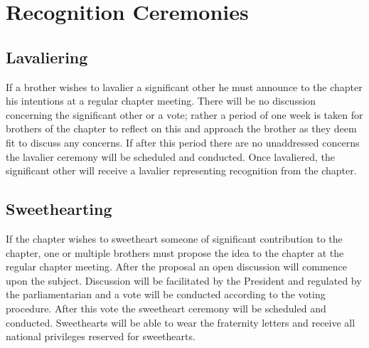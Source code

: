 \chapter{Recognition Ceremonies}
\label{cha:recognition-ceremonies}

\section{Lavaliering}

If a brother wishes to lavalier a significant other he must announce to the
chapter his intentions at a regular chapter meeting.
There will be no discussion concerning the significant other or a vote; rather
a period of one week is taken for brothers of the chapter to reflect on this
and approach the brother as they deem fit to discuss any concerns.
If after this period there are no unaddressed concerns the lavalier ceremony
will be scheduled and conducted.
Once lavaliered, the significant other will receive a lavalier representing
recognition from the chapter.

\section{Sweethearting}

If the chapter wishes to sweetheart someone of significant contribution to the
chapter, one or multiple brothers must propose the idea to the chapter at the
regular chapter meeting.
After the proposal an open discussion will commence upon the subject.
Discussion will be facilitated by the President and regulated by the
parliamentarian and a vote will be conducted according to the voting procedure.
After this vote the sweetheart ceremony will be scheduled and conducted.
Sweethearts will be able to wear the fraternity letters and receive all
national privileges reserved for sweethearts.

